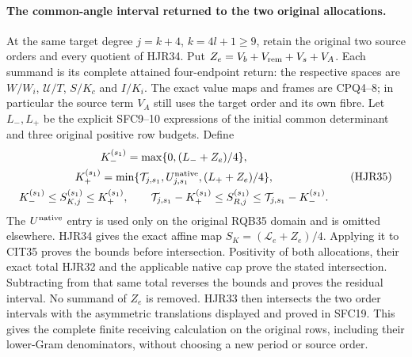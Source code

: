 \documentclass[11pt,a4paper]{article}
\begin{document}
\paragraph{The common-angle interval returned to the two original allocations.}
At the same target degree $j=k+4$, $k=4l+1\ge9$, retain the
original two source orders and every quotient of HJR34.
Put $Z_e=V_b+V_{\rm rem}+V_s+V_A$. Each summand is its
complete attained four-endpoint return: the respective spaces
are $W/W_i$, $\mathcal U/T$, $S/K_c$ and $I/K_i$.
The exact value maps and frames are CPQ4--8; in particular the
source term $V_A$ still uses the target order and its own fibre.
Let $L_-,L_+$ be the explicit SFC9--10 expressions of the
initial common determinant and three original positive row budgets.
Define
\[
 \begin{gathered}
 K_-^{(s_1)}=\max\{0,(L_-+Z_e)/4\},\\
 K_+^{(s_1)}=\min\{\mathcal T_{j,s_1},
                  U_{j,s_1}^{\rm native},(L_++Z_e)/4\},\\
 K_-^{(s_1)}\le S_{K,j}^{(s_1)}\le K_+^{(s_1)},\qquad
 \mathcal T_{j,s_1}-K_+^{(s_1)}\le S_{R,j}^{(s_1)}
                          \le\mathcal T_{j,s_1}-K_-^{(s_1)}.
 \end{gathered}\tag{HJR35}
\]
The $U^{\rm native}$ entry is used only on the original RQB35
domain and is omitted elsewhere. HJR34 gives the exact affine
map $S_K=(\mathcal L_e+Z_e)/4$. Applying it to CIT35 proves
the bounds before intersection. Positivity of both allocations,
their exact total HJR32 and the applicable native cap prove
the stated intersection. Subtracting from that same total
reverses the bounds and proves the residual interval.
No summand of $Z_e$ is removed. HJR33 then intersects the two
order intervals with the asymmetric translations displayed
and proved in SFC19. This gives the complete finite receiving
calculation on the original rows, including their lower-Gram
denominators, without choosing a new period or source order.


\end{document}
